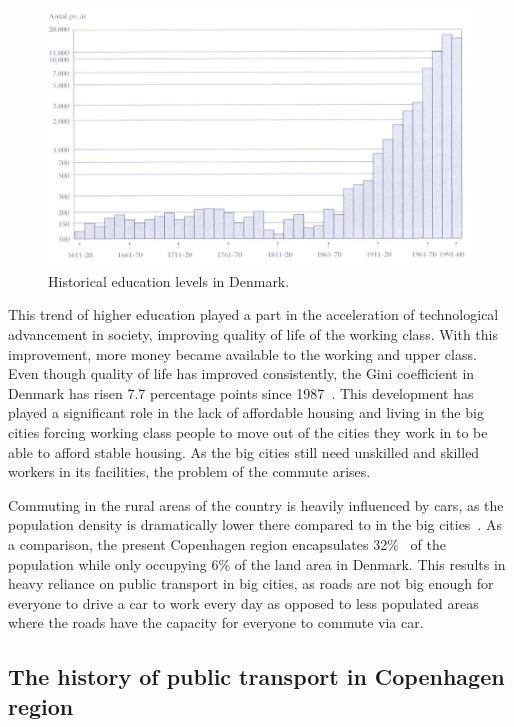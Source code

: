 \begin{figure}
    \centering
    \includegraphics[width=\textwidth]{images/education-levels}
    \caption{Historical education levels in Denmark.}
    \label{fig:figure5}
\end{figure}

This trend of higher education played a part in the acceleration of technological advancement in society, improving
quality of life of the working class.
With this improvement, more money became available to the working and upper class.
Even though quality of life has improved consistently, the Gini coefficient in Denmark has risen 7.7 percentage points
since 1987~\cite{cepos2023}.
This development has played a significant role in the lack of affordable housing and living in the big cities forcing
working class people to move out of the cities they work in to be able to afford stable housing.
As the big cities still need unskilled and skilled workers in its facilities, the problem of the commute arises.

Commuting in the rural areas of the country is heavily influenced by cars, as the population density is dramatically
lower there compared to in the big cities~\cite{mulacic2020}.
As a comparison, the present Copenhagen region encapsulates 32\%~\cite{statistikbanken2023} of the
population while only occupying 6\% of the land area in Denmark.
This results in heavy reliance on public transport in big cities, as roads are not big enough for everyone to drive a
car to work every day as opposed to less populated areas where the roads have the capacity for everyone to commute via
car.

\subsection{The history of public transport in Copenhagen region}
\label{subsec:the-history-of-public-transport-in-copenhagen-region}

